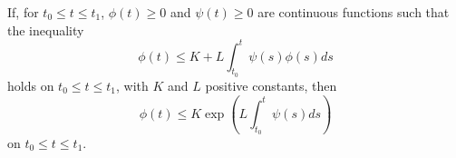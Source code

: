 \documentclass[12pt]{article}
\begin{document}
If, for $t_0\leq t\leq t_1$, $\phi(t)\geq 0$ and $\psi(t)\geq 0$ are continuous functions such that the inequality
\[
\phi(t)\leq K+L\int_{t_0}^t \psi(s)\phi(s)ds
\]
holds on $t_0\leq t\leq t_1$, with $K$ and $L$ positive constants, then
\[
\phi(t)\leq K\exp\left(L\int_{t_0}^t \psi(s)ds\right)
\]
on $t_0\leq t\leq t_1$.
\end{document}

